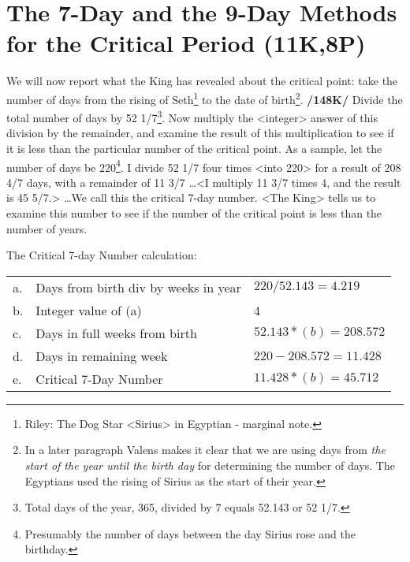 \section{The 7-Day and the 9-Day Methods for the Critical Period (11K,8P)}

We will now report what the King has revealed about the critical point: take the number of days from the rising of Seth\footnote{Riley: The Dog Star <Sirius> in Egyptian - marginal note.} to the date of birth\footnote{In a later paragraph Valens makes it clear that we are using days from \textsl{the start of the year until the birth day} for determining the number of days. The Egyptians used the rising of Sirius as the start of their year.}. \textbf{/148K/} Divide the total number of days by 52 1/7\footnote{Total days of the year, 365, divided by 7 equals  52.143 or 52 1/7.}. Now multiply the <integer> answer of this division by the remainder, and examine the result of this multiplication to see if it is less than the particular number of the critical point. As a sample, let the number of days be 220\footnote{Presumably the number of days between the day Sirius rose and the birthday.}. I divide 52 1/7 four times <into 220> for a result of 208 4/7 days, with a remainder of 11 3/7 \ldots <I multiply 11 3/7 times 4, and the result is 45 5/7.> \ldots We call this the critical 7-day number.
<The King> tells us to examine this number to see if the number of the critical point is less than the number of years. 

\begin{mdframed}[backgroundcolor=cyan!5]
\tiny
The Critical 7-day Number calculation:
\begin{longtable}[h]{l l l}
a. & Days from birth div by weeks in year &
		$220 / 52.143 = 4.219$		\\
b. & Integer value of (a) & 4 \\		
c. & Days in full weeks from birth & $52.143 * (b) = 208.572$		 \\
d. & Days in remaining week & $220 - 208.572 = 11.428$	\\
e. & Critical 7-Day Number & $11.428 * (b) = 45.712$		\\
\end{longtable}
\end{mdframed}


